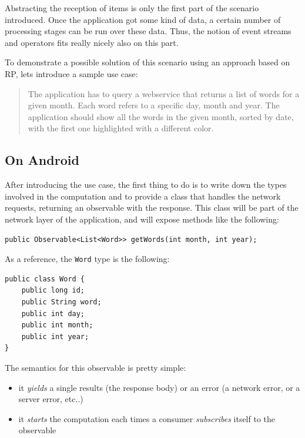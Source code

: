 Abstracting the reception of items is only the first part of the
scenario introduced. Once the application got some kind of data, a
certain number of processing stages can be run over these data. Thus,
the notion of event streams and operators fits really nicely also on
this part.

To demonstrate a possible solution of this scenario using an approach
based on RP, lets introduce a sample use case:

\begin{quote}
The application has to query a webservice that returns a list of words
for a given month. Each word refers to a specific day, month and year.
The application should show all the words in the given month, sorted by
date, with the first one highlighted with a different color.
\end{quote}

\subsection{On Android}\label{on-android}

After introducing the use case, the first thing to do is to write down
the types involved in the computation and to provide a class that
handles the network requests, returning an observable with the response.
This class will be part of the network layer of the application, and
will expose methods like the following:

\begin{verbatim}
public Observable<List<Word>> getWords(int month, int year);
\end{verbatim}

As a reference, the \texttt{Word} type is the following:

\begin{verbatim}
public class Word {
    public long id;
    public String word;
    public int day;
    public int month;
    public int year;
}
\end{verbatim}

The semantics for this observable is pretty simple:

\begin{itemize}
\itemsep1pt\parskip0pt
\item
  it \emph{yields} a single results (the response body) or an error (a
  network error, or a server error, etc..)
\item
  it \emph{starts} the computation each times a consumer
  \emph{subscribes} itself to the observable
\end{itemize}

